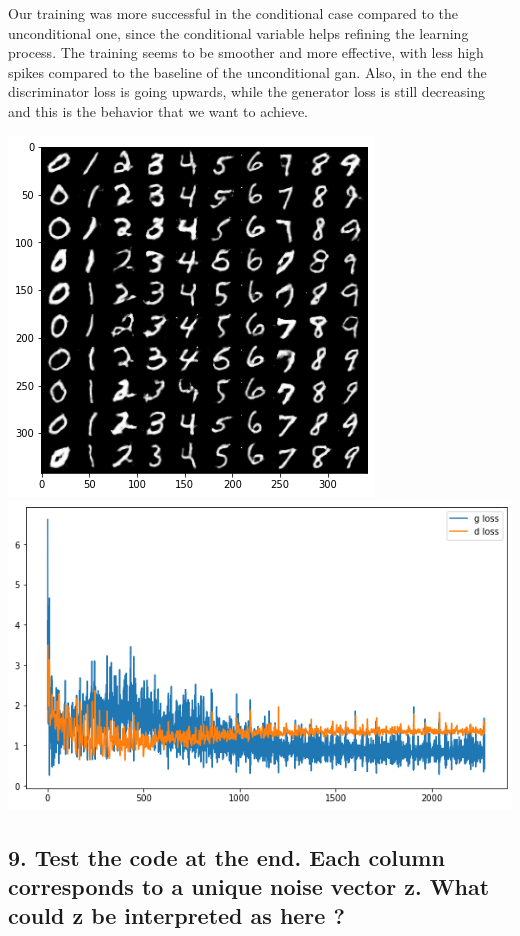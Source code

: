Our training was more successful in the conditional case compared to the
unconditional one, since the conditional variable helps refining the
learning process. The training seems to be smoother and more effective,
with less high spikes compared to the baseline of the unconditional gan.
Also, in the end the discriminator loss is going upwards, while the
generator loss is still decreasing and this is the behavior that we want
to achieve.

\includegraphics{./images/Pasted image 20231229115925.png}
\includegraphics{./images/Pasted image 20231229115930.png}

\hypertarget{test-the-code-at-the-end.-each-column-corresponds-to-a-unique-noise-vector-z.-what-could-z-be-interpreted-as-here}{%
\subsection{9. Test the code at the end. Each column corresponds to a
unique noise vector z. What could z be interpreted as here
?}\label{test-the-code-at-the-end.-each-column-corresponds-to-a-unique-noise-vector-z.-what-could-z-be-interpreted-as-here}}

